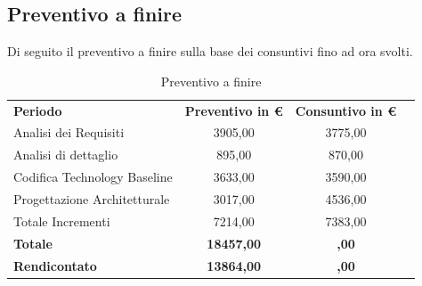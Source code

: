 \clearpage
\subsection{Preventivo a finire}
Di seguito il preventivo a finire sulla base dei consuntivi fino ad ora svolti.
\begin{table} [h!]
	\begin{center}
		\begin{tabular} { m{8 cm} c c c  }
			\rowcolor{lightgray}
			\textbf{Periodo}  & \textbf{Preventivo in \euro} & \textbf{Consuntivo in \euro} \\
			Analisi dei Requisiti   			& 3905,00     & 3775,00 \\
			Analisi di dettaglio  				& 895,00     & 870,00 \\
			Codifica Technology Baseline        & 3633,00     & 3590,00 \\
			Progettazione Architetturale		&3017,00		&  4536,00\\
			Totale Incrementi				& 7214,00		&	7383,00\\
			\textbf{Totale}     & \textbf{18457,00}         & \textbf{,00}   \\
			\textbf{Rendicontato}  & \textbf{13864,00}          & \textbf{,00}   \\
			
			
		\end{tabular}
		\caption{Preventivo a finire }
	\end{center}
\end{table}
 \\
